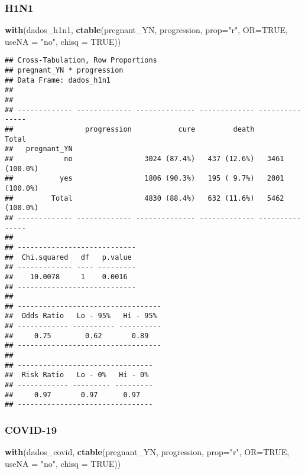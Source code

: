\documentclass[
]{article}
\newenvironment{Shaded}{\begin{snugshade}}{\end{snugshade}}
\newcommand{\DataTypeTok}[1]{\textcolor[rgb]{0.13,0.29,0.53}{#1}}
\newcommand{\KeywordTok}[1]{\textcolor[rgb]{0.13,0.29,0.53}{\textbf{#1}}}
\newcommand{\NormalTok}[1]{#1}
\newcommand{\OtherTok}[1]{\textcolor[rgb]{0.56,0.35,0.01}{#1}}
\newcommand{\StringTok}[1]{\textcolor[rgb]{0.31,0.60,0.02}{#1}}
\begin{document}
\hypertarget{h1n1-16}{%
\subsubsection{H1N1}\label{h1n1-16}}

\begin{Shaded}
\begin{Highlighting}[]
\KeywordTok{with}\NormalTok{(dados_h1n1, }\KeywordTok{ctable}\NormalTok{(pregnant_YN, progression, }\DataTypeTok{prop=}\StringTok{"r"}\NormalTok{, }\DataTypeTok{OR=}\OtherTok{TRUE}\NormalTok{, }\DataTypeTok{useNA =} \StringTok{"no"}\NormalTok{, }\DataTypeTok{chisq =} \OtherTok{TRUE}\NormalTok{))}
\end{Highlighting}
\end{Shaded}

\begin{verbatim}
## Cross-Tabulation, Row Proportions  
## pregnant_YN * progression  
## Data Frame: dados_h1n1  
## 
## 
## ------------- ------------- -------------- ------------- ---------------
##                 progression           cure         death           Total
##   pregnant_YN                                                           
##            no                 3024 (87.4%)   437 (12.6%)   3461 (100.0%)
##           yes                 1806 (90.3%)   195 ( 9.7%)   2001 (100.0%)
##         Total                 4830 (88.4%)   632 (11.6%)   5462 (100.0%)
## ------------- ------------- -------------- ------------- ---------------
## 
## ----------------------------
##  Chi.squared   df   p.value 
## ------------- ---- ---------
##    10.0078     1    0.0016  
## ----------------------------
## 
## ----------------------------------
##  Odds Ratio   Lo - 95%   Hi - 95% 
## ------------ ---------- ----------
##     0.75        0.62       0.89   
## ----------------------------------
## 
## --------------------------------
##  Risk Ratio   Lo - 0%   Hi - 0% 
## ------------ --------- ---------
##     0.97       0.97      0.97   
## --------------------------------
\end{verbatim}

\hypertarget{covid-19-16}{%
\subsubsection{COVID-19}\label{covid-19-16}}

\begin{Shaded}
\begin{Highlighting}[]
\KeywordTok{with}\NormalTok{(dados_covid, }\KeywordTok{ctable}\NormalTok{(pregnant_YN, progression, }\DataTypeTok{prop=}\StringTok{"r"}\NormalTok{, }\DataTypeTok{OR=}\OtherTok{TRUE}\NormalTok{, }\DataTypeTok{useNA =} \StringTok{"no"}\NormalTok{, }\DataTypeTok{chisq =} \OtherTok{TRUE}\NormalTok{))}
\end{Highlighting}
\end{Shaded}
\end{document}
